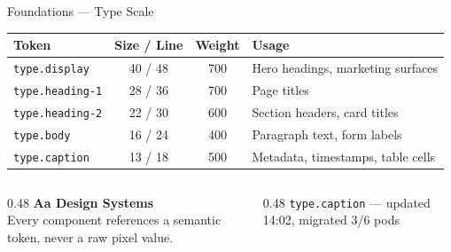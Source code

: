 \documentclass[aspectratio=169,10pt]{beamer}
\begin{document}
\begin{frame}{Foundations --- Type Scale}
  \small
  \begin{table}
    \centering
    \renewcommand{\arraystretch}{1.3}
    \begin{tabular}{@{}lccl@{}}
      \toprule
      \textbf{Token} & \textbf{Size / Line} & \textbf{Weight} & \textbf{Usage} \\
      \midrule
      \texttt{type.display} & 40 / 48 & 700 & Hero headings, marketing surfaces \\
      \texttt{type.heading-1} & 28 / 36 & 700 & Page titles \\
      \texttt{type.heading-2} & 22 / 30 & 600 & Section headers, card titles \\
      \texttt{type.body} & 16 / 24 & 400 & Paragraph text, form labels \\
      \texttt{type.caption} & 13 / 18 & 500 & Metadata, timestamps, table cells \\
      \bottomrule
    \end{tabular}
  \end{table}
  \vspace{0.4cm}
  \begin{columns}[T]
    \begin{column}{0.48\textwidth}
      {\large\bfseries\color{nexateal} Aa Design Systems}\\[2pt]
      {\normalsize Every component references a semantic token, never a raw pixel value.}
    \end{column}
    \begin{column}{0.48\textwidth}
      {\scriptsize\color{nexagray}\texttt{type.caption} --- updated 14:02, migrated 3/6 pods}
    \end{column}
  \end{columns}
\end{frame}
\end{document}
